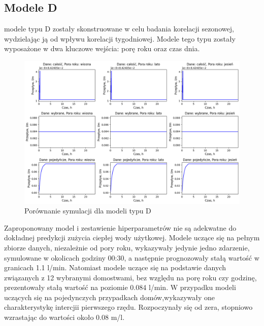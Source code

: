 \documentclass[a4paper,twoside,12pt]{book}
\begin{document}
\newpage
\subsection*{Modele D}
modele typu D zostały skonstruowane w celu badania korelacji sezonowej, wydzielając ją od wpływu korelacji tygodniowej. Modele tego typu zostały wyposażone w dwa kluczowe wejścia: porę roku oraz czas dnia.
\begin{figure}[!h]
  \centering
  \includegraphics[width=1\textwidth]{img/Model_D.png}
  \caption{Porównanie symulacji dla modeli typu D}
  \label{fig:etykieta-rysunku}
\end{figure}
Zaproponowany model i zestawienie hiperparametrów nie są adekwatne do dokładnej predykcji zużycia ciepłej wody użytkowej. Modele uczące się na pełnym zbiorze danych, niezależnie od pory roku, wykazywały jedynie jedno zdarzenie, symulowane w okolicach godziny 00:30, a następnie prognozowały stałą wartość w granicach 1.1 l/min. Natomiast modele uczące się na podstawie danych związanych z 12 wybranymi domostwami, bez względu na porę roku czy godzinę, prezentowały stałą wartość na poziomie 0.084 l/min. W przypadku modeli uczących się na pojedynczych przypadkach domów,wykazywały one charakterystykę intercjii pierwszego rzędu. Rozpoczynały się od zera, stopniowo wzrastając do wartości około 0.08 m/l.\\
\end{document}
